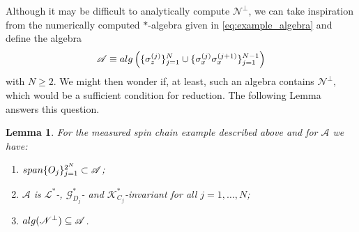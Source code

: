\documentclass[aihp,12pt]{imsart}
\newcommand{\Gc}{\mathcal{G}}
\newcommand{\Kc}{\mathcal{K}}
\newcommand{\Lc}{\mathcal{L}}
\newcommand{\As}{\mathscr{A}}
\newcommand{\Ns}{\mathscr{N}}
\newcommand{\Span}{{\rm span}}
\newcommand{\alg}{{\rm alg}}
\theoremstyle{theorem}
\newtheorem{lemma}{Lemma}
\theoremstyle{definition}
\theoremstyle{remark}
\begin{document}
Although it may be difficult to analytically compute $\Ns^\perp$, we can take inspiration from the numerically computed $*$-algebra given in \eqref{eq:example_algebra} and define the algebra
\[\As \equiv \alg\left(\{ \sigma_z^{(j)}\}_{j=1}^N\cup\{\sigma_x^{(j)}\sigma_x^{(j+1)}\}_{j=1}^{N-1}\right)\] 
with $N\geq2$. We might then wonder if, at least, such an algebra contains $\Ns^\perp,$ which would be a sufficient condition for reduction.
The following Lemma answers this question. 
\begin{lemma} 
    For the measured spin chain example described above and for $\As$ we have:
    \begin{enumerate}
        \item $\Span\{O_j\}_{j=1}^{2^N}\subset \As$;
        \item $\As$ is $\Lc^*$-, $\Gc_{D_j}^*$- and $\Kc_{C_j}^*$-invariant for all $j=1,\dots,N$;
        \item $\alg(\Ns^\perp)\subseteq\As$.
    \end{enumerate}
\end{lemma}
\end{document}
